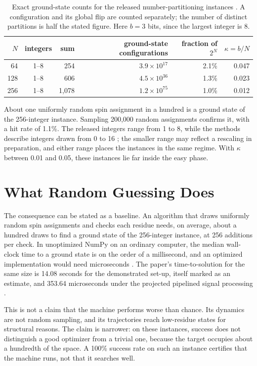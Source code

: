 \documentclass[11pt]{article}
\theoremstyle{definition}
\theoremstyle{remark}
\begin{document}
\begin{table}[h]
\centering
\small
\begin{tabular}{rcrrrr}
\toprule
$N$ & integers & sum & ground-state configurations & fraction of $2^N$ & $\kappa = b/N$ \\
\midrule
64 & 1--8 & 254 & $3.9 \times 10^{17}$ & 2.1\% & 0.047 \\
128 & 1--8 & 606 & $4.5 \times 10^{36}$ & 1.3\% & 0.023 \\
256 & 1--8 & 1{,}078 & $1.2 \times 10^{75}$ & 1.0\% & 0.012 \\
\bottomrule
\end{tabular}
\caption{Exact ground-state counts for the released number-partitioning instances \cite{cmimrepo}. A configuration and its global flip are counted separately; the number of distinct partitions is half the stated figure. Here $b = 3$ bits, since the largest integer is 8.}
\label{tab:counts}
\end{table}

About one uniformly random spin assignment in a hundred is a ground state of the 256-integer instance. Sampling 200,000 random assignments confirms it, with a hit rate of 1.1\%. The released integers range from 1 to 8, while the methods describe integers drawn from 0 to 16 \cite{alkayed2025}; the smaller range may reflect a rescaling in preparation, and either range places the instances in the same regime. With $\kappa$ between 0.01 and 0.05, these instances lie far inside the easy phase.

\section{What Random Guessing Does}

The consequence can be stated as a baseline. An algorithm that draws uniformly random spin assignments and checks each residue needs, on average, about a hundred draws to find a ground state of the 256-integer instance, at 256 additions per check. In unoptimized NumPy on an ordinary computer, the median wall-clock time to a ground state is on the order of a millisecond, and an optimized implementation would need microseconds \cite{flyxion-script2}. The paper's time-to-solution for the same size is 14.08 seconds for the demonstrated set-up, itself marked as an estimate, and 353.64 microseconds under the projected pipelined signal processing \cite{alkayed2025}.

This is not a claim that the machine performs worse than chance. Its dynamics are not random sampling, and its trajectories reach low-residue states for structural reasons. The claim is narrower: on these instances, success does not distinguish a good optimizer from a trivial one, because the target occupies about a hundredth of the space. A 100\% success rate on such an instance certifies that the machine runs, not that it searches well.
\end{document}
